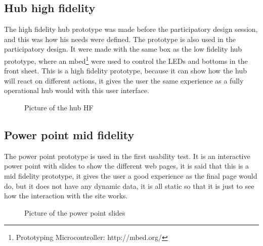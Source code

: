\subsection{Hub high fidelity}
The high fidelity hub prototype was made before the participatory design session, and this was how his needs were defined. The prototype is also used in the participatory design. It were made with the same box as the low fidelity hub prototype, where an mbed\footnote{Prototyping Microcontroller: http://mbed.org/}  were used to control the LEDs and bottoms in the front sheet. This is a high fidelity prototype, because it can show how the hub will react on different actions, it gives the user the same experience as a fully operational hub would with this user interface.
\begin{figure}[H]
	\center
		\setlength\fboxsep{0pt}
		\setlength\fboxrule{1pt}
   	\caption{Picture of the hub HF}
   	\label{fig:High fidelity hub}
\end{figure}

\subsection{Power point mid fidelity}
The power point prototype is used in the first usability test. It is an interactive power point with slides to show the different web pages, it is said that this is a mid fidelity prototype, it gives the user a good experience as the final page would do, but it does not have any dynamic data, it is all static so that it is just to see how the interaction with the site works.
\begin{figure}[H]
	\center
		\setlength\fboxsep{0pt}
		\setlength\fboxrule{1pt}
   	\caption{Picture of the power point slides}
   	\label{fig:web_interface1}
\end{figure}

